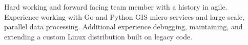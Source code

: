 

\begin{cvparagraph}

Hard working and forward facing team member with a history in agile. Experience working with Go and Python GIS micro-services and large scale, parallel data processing.
Additional experience debugging, maintaining, and extending a custom Linux distribution built on legacy code.
\end{cvparagraph}
